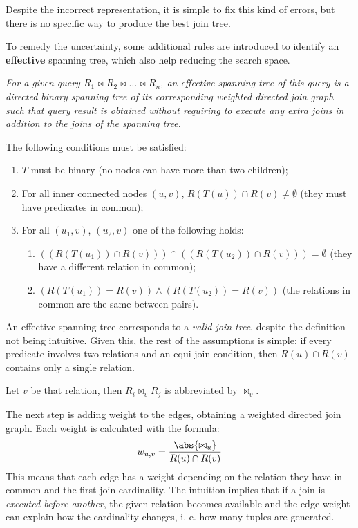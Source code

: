 Despite the incorrect representation, it is simple to fix this kind of errors, but there is no specific way to produce the best join tree.

To remedy the uncertainty, some additional rules are introduced to identify an \textbf{effective} spanning tree, which also help reducing the search space.

\textit{For a given query $R_1 \bowtie R_2 \bowtie \dots \bowtie R_n$, an effective spanning tree of this query is a directed binary spanning tree of its corresponding weighted directed join graph such that query result is obtained without requiring to execute any extra joins in addition to the joins of the spanning tree.}

The following conditions must be satisfied:
\begin{enumerate}
	\item $T$ must be binary (no nodes can have more than two children);
	\item For all inner connected nodes $(u, v)$, $R(T(u)) \cap R(v) \neq \emptyset$ (they must have predicates in common);
	\item For all $(u_1, v)$, $(u_2, v)$ one of the following holds:
	\begin{enumerate}
		\item $((R(T(u_1)) \cap R(v))) \cap ((R(T(u_2)) \cap R(v))) = \emptyset$ (they have a different relation in common);
		\item $(R(T(u_1)) = R(v)) \land (R(T(u_2)) = R(v))$ (the relations in common are the same between pairs).
	\end{enumerate}
\end{enumerate}
An effective spanning tree corresponds to a \textit{valid join tree}, despite the definition not being intuitive. Given this, the rest of the assumptions is simple: if every predicate involves two relations and an equi-join condition, then $R(u) \cap R(v)$ contains only a single relation.

Let $v$ be that relation, then $R_i \bowtie_v R_j$ is abbreviated by $\bowtie_v$.

The next step is adding weight to the edges, obtaining a weighted directed join graph. Each weight is calculated with the formula:
$$w_{u, v} = \frac{\abs{\bowtie_u}}{R(u) \cap R(v)}$$
This means that each edge has a weight depending on the relation they have in common and the first join cardinality. The intuition implies that if a join is \textit{executed before another}, the given relation becomes available and the edge weight can explain how the cardinality changes, i. e. how many tuples are generated.

